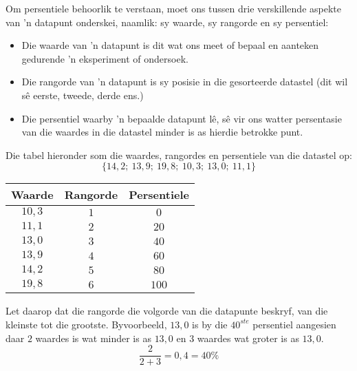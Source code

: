 Om persentiele behoorlik te verstaan, moet ons tussen drie verskillende aspekte van ’n datapunt onderskei, naamlik: sy waarde, sy rangorde en sy persentiel:
\begin{itemize}
 \item Die waarde van ’n datapunt is dit wat ons meet of bepaal en aanteken gedurende ’n eksperiment of ondersoek.
\item Die rangorde van ’n datapunt is sy posisie in die gesorteerde datastel (dit wil sê eerste, tweede, derde ens.)  
\item Die persentiel waarby ’n bepaalde datapunt lê, sê vir ons watter persentasie van die waardes in die datastel minder is as hierdie betrokke punt.
\end{itemize}
\par
   Die tabel hieronder som die waardes, rangordes en persentiele van die datastel op:
  \begin{equation*}
    \{14,2;\ 13,9;\ 19,8;\ 10,3;\ 13,0;\ 11,1\}
  \end{equation*}

  \begin{center}
    \begin{tabular}{|c|c|c|} \hline

      \textbf{Waarde} & \textbf{Rangorde} & \textbf{Persentiele} \\\hline

      $10,3$  & $1$    & $0$ \\\hline
      $11,1$  & $2$    & $20$ \\\hline
      $13,0$  & $3$    & $40$ \\\hline
      $13,9$  & $4$    & $60$ \\\hline
      $14,2$  & $5$    & $80$ \\\hline
      $19,8$  & $6$    & $100$ \\\hline

    \end{tabular}
  \end{center}

 Let daarop dat die rangorde die volgorde van die datapunte beskryf, van die kleinste tot die grootste. Byvoorbeeld, $13,0$ is by die $40^{ste}$ persentiel aangesien daar $2$ waardes is wat minder is as $13,0$ en $3$ waardes wat groter is as $13,0$. 
  \begin{equation*}
    \frac{2}{2+3} = 0,4 = 40\%
  \end{equation*}

